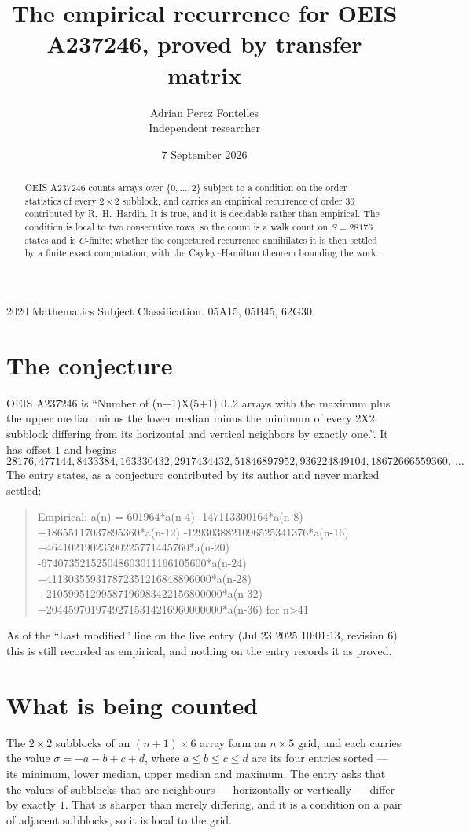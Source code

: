 \documentclass[11pt,a4paper]{article}
\title{The empirical recurrence for OEIS A237246, proved by transfer matrix}
\author{Adrian Perez Fontelles\\ \small Independent researcher}
\date{7 September 2026}
\theoremstyle{plain}
\theoremstyle{definition}
\begin{document}
\maketitle

\begin{abstract}
OEIS A237246 counts arrays over $\{0,\dots,2\}$ subject to a condition on the order
statistics of every $2\times2$ subblock, and carries an empirical recurrence of order
$36$ contributed by R.~H.~Hardin. It is true, and it is decidable rather than empirical.
The condition is local to two consecutive rows, so the count is a walk count on $S=28176$
states and is $C$-finite; whether the conjectured recurrence annihilates it is then settled by
a finite exact computation, with the Cayley--Hamilton theorem bounding the work.
\end{abstract}

\noindent\small 2020 Mathematics Subject Classification. 05A15, 05B45, 62G30.\normalsize

\section{The conjecture}

OEIS A237246 is ``Number of (n+1)X(5+1) 0..2 arrays with the maximum plus the upper median minus the lower median minus the minimum of every 2X2 subblock differing from its horizontal and vertical neighbors by exactly one.''. It has offset $1$ and begins
\[
28176, 477144, 8433384, 163330432, 2917434432, 51846897952, 936224849104, 18672666559360,\ \dots
\]
The entry states, as a conjecture contributed by its author and never marked settled:
\begin{quote}
Empirical: a(n) = 601964*a(n-4) -147113300164*a(n-8) +18655117037895360*a(n-12) -1293038821096525341376*a(n-16) +46410219023590225771445760*a(n-20) -674073521525048603011166105600*a(n-24) +411303559317872351216848896000*a(n-28) +21059951299587196983422156800000*a(n-32) +20445970197492715314216960000000*a(n-36) for n>41
\end{quote}
As of the ``Last modified'' line on the live entry (Jul 23 2025 10:01:13, revision 6) this is still
recorded as empirical, and nothing on the entry records it as proved.

\section{What is being counted}

The $2\times2$ subblocks of an $(n+1)\times6$ array form an
$n\times5$ grid, and each carries the value $\sigma=-a-b+c+d$, where $a\le b\le c\le d$ are its four entries sorted --- its minimum, lower median, upper median and maximum. The entry asks that the values of
subblocks that are neighbours --- horizontally or vertically --- differ by exactly $1$.
That is sharper than merely differing, and it is a condition on a pair of adjacent subblocks,
so it is local to the grid.
\end{document}
